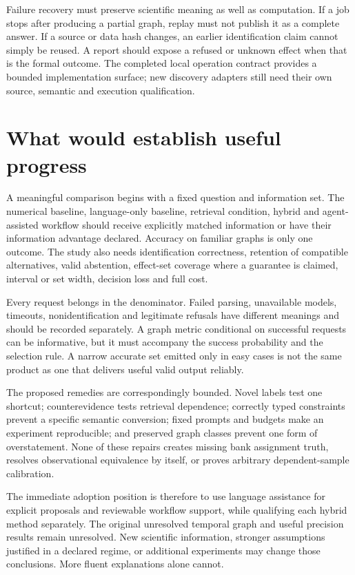 Failure recovery must preserve scientific meaning as well as computation. If a
job stops after producing a partial graph, replay must not publish it as a
complete answer. If a source or data hash changes, an earlier identification
claim cannot simply be reused. A report should expose a refused or unknown
effect when that is the formal outcome. The completed local operation contract
provides a bounded implementation surface; new discovery adapters still need
their own source, semantic and execution qualification.

\section{What would establish useful progress}

A meaningful comparison begins with a fixed question and information set.
The numerical baseline, language-only baseline, retrieval condition, hybrid
and agent-assisted workflow should receive explicitly matched information or
have their information advantage declared. Accuracy on familiar graphs is
only one outcome. The study also needs identification correctness, retention
of compatible alternatives, valid abstention, effect-set coverage where a
guarantee is claimed, interval or set width, decision loss and full cost.

Every request belongs in the denominator. Failed parsing, unavailable models,
timeouts, nonidentification and legitimate refusals have different meanings
and should be recorded separately. A graph metric conditional on successful
requests can be informative, but it must accompany the success probability
and the selection rule. A narrow accurate set emitted only in easy cases is
not the same product as one that delivers useful valid output reliably.

The proposed remedies are correspondingly bounded. Novel labels test one
shortcut; counterevidence tests retrieval dependence; correctly typed
constraints prevent a specific semantic conversion; fixed prompts and budgets
make an experiment reproducible; and preserved graph classes prevent one form
of overstatement. None of these repairs creates missing bank assignment
truth, resolves observational equivalence by itself, or proves arbitrary
dependent-sample calibration.

The immediate adoption position is therefore to use language assistance for
explicit proposals and reviewable workflow support, while qualifying each
hybrid method separately. The original unresolved temporal graph and useful
precision results remain unresolved. New scientific information, stronger
assumptions justified in a declared regime, or additional experiments may
change those conclusions. More fluent explanations alone cannot.
